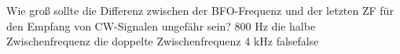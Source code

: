     {Wie groß sollte die Differenz zwischen der BFO-Frequenz und der letzten ZF für den Empfang von CW-Signalen ungefähr sein?}
    {800 Hz}
    {die halbe Zwischenfrequenz}
    {die doppelte Zwischenfrequenz}
    {4 kHz}
    {false}{false}